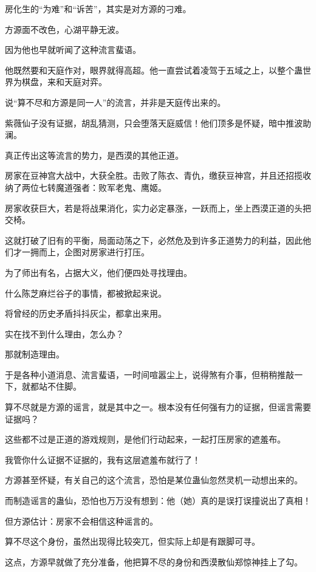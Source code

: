 
\begin{this_body}

房化生的“为难”和“诉苦”，其实是对方源的刁难。

方源面不改色，心湖平静无波。

因为他也早就听闻了这种流言蜚语。

他既然要和天庭作对，眼界就得高超。他一直尝试着凌驾于五域之上，以整个蛊世界为棋盘，来和天庭对弈。

说“算不尽和方源是同一人”的流言，并非是天庭传出来的。

紫薇仙子没有证据，胡乱猜测，只会堕落天庭威信！他们顶多是怀疑，暗中推波助澜。

真正传出这等流言的势力，是西漠的其他正道。

房家在豆神宫大战中，大获全胜。击败了陈衣、青仇，缴获豆神宫，并且还招揽收纳了两位七转魔道强者：败军老鬼、鹰姬。

房家收获巨大，若是将战果消化，实力必定暴涨，一跃而上，坐上西漠正道的头把交椅。

这就打破了旧有的平衡，局面动荡之下，必然危及到许多正道势力的利益，因此他们才一拥而上，企图对房家进行打压。

为了师出有名，占据大义，他们便四处寻找理由。

什么陈芝麻烂谷子的事情，都被掀起来说。

将曾经的历史矛盾抖抖灰尘，都拿出来用。

实在找不到什么理由，怎么办？

那就制造理由。

于是各种小道消息、流言蜚语，一时间喧嚣尘上，说得煞有介事，但稍稍推敲一下，就都站不住脚。

算不尽就是方源的谣言，就是其中之一。根本没有任何强有力的证据，但谣言需要证据吗？

这些都不过是正道的游戏规则，是他们行动起来，一起打压房家的遮羞布。

我管你什么证据不证据的，我有这层遮羞布就行了！

方源甚至怀疑，有关自己的这个流言，恐怕是某位蛊仙忽然灵机一动想出来的。

而制造谣言的蛊仙，恐怕也万万没有想到：他（她）真的是误打误撞说出了真相！

但方源估计：房家不会相信这种谣言的。

算不尽这个身份，虽然出现得比较突兀，但实际上却是有跟脚可寻。

这点，方源早就做了充分准备，他把算不尽的身份和西漠散仙郑惊神挂上了勾。


\end{this_body}
